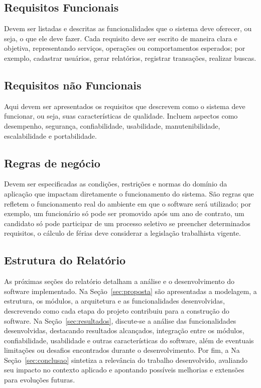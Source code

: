 \documentclass{article}
\begin{document}
\subsection{Requisitos Funcionais}

Devem ser listadas e descritas as funcionalidades que o sistema deve oferecer, ou seja, o que ele deve fazer. Cada requisito deve ser escrito de maneira clara e objetiva, representando serviços, operações ou comportamentos esperados; por exemplo, cadastrar usuários, gerar relatórios, registrar transações, realizar buscas.

\subsection{Requisitos não Funcionais}

Aqui devem ser apresentados os requisitos que descrevem como o sistema deve funcionar, ou seja, suas características de qualidade. Incluem aspectos como desempenho, segurança, confiabilidade, usabilidade, manutenibilidade, escalabilidade e portabilidade. 

\subsection{Regras de negócio}

Devem ser especificadas as condições, restrições e normas do domínio da aplicação que impactam diretamente o funcionamento do sistema. São regras que refletem o funcionamento real do ambiente em que o software será utilizado; por exemplo, um funcionário só pode ser promovido após um ano de contrato, um candidato só pode participar de um processo seletivo se preencher determinados requisitos, o cálculo de férias deve considerar a legislação trabalhista vigente.

\subsection{Estrutura do Relatório}

As próximas seções do relatório detalham a análise e o desenvolvimento do software implementado. Na Seção~\ref{sec:proposta} são apresentadas a modelagem, a estrutura, os módulos, a arquitetura e as funcionalidades desenvolvidas, descrevendo como cada etapa do projeto contribuiu para a construção do software. Na Seção~\ref{sec:resultados}, discute-se a análise das funcionalidades desenvolvidas, destacando resultados alcançados, integração entre os módulos, confiabilidade, usabilidade e outras características do software, além de eventuais limitações ou desafios encontrados durante o desenvolvimento. Por fim, a Na Seção~\ref{sec:conclusao} sintetiza a relevância do trabalho desenvolvido, avaliando seu impacto no contexto aplicado e apontando possíveis melhorias e extensões para evoluções futuras.
\end{document}
